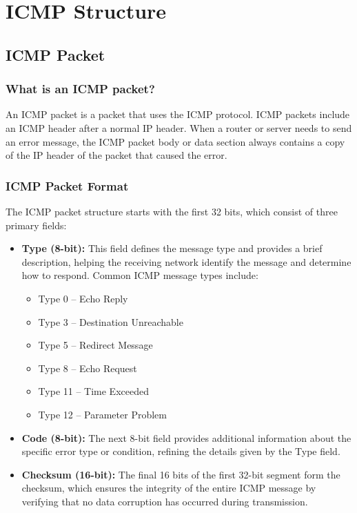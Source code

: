 \chapter{ICMP Structure}
\minitoc

\newpage
\section{ICMP Packet}
\subsection{What is an ICMP packet?}
An ICMP packet is a packet that uses the ICMP protocol. ICMP packets include an ICMP header after a normal IP header. When a router or server needs to send an error message, the ICMP packet body or data section always contains a copy of the IP header of the packet that caused the error.

\subsection{ICMP Packet Format}
The ICMP packet structure starts with the first 32 bits, which consist of three primary fields:

\begin{itemize}
	\item \textbf{Type (8-bit):} This field defines the message type and provides a brief description, helping the receiving network identify the message and determine how to respond. Common ICMP message types include:
	\begin{itemize}
		\item Type 0 – Echo Reply
		\item Type 3 – Destination Unreachable
		\item Type 5 – Redirect Message
		\item Type 8 – Echo Request
		\item Type 11 – Time Exceeded
		\item Type 12 – Parameter Problem
	\end{itemize}
	
	\item \textbf{Code (8-bit):} The next 8-bit field provides additional information about the specific error type or condition, refining the details given by the Type field.
	
	\item \textbf{Checksum (16-bit):} The final 16 bits of the first 32-bit segment form the checksum, which ensures the integrity of the entire ICMP message by verifying that no data corruption has occurred during transmission.
\end{itemize}

